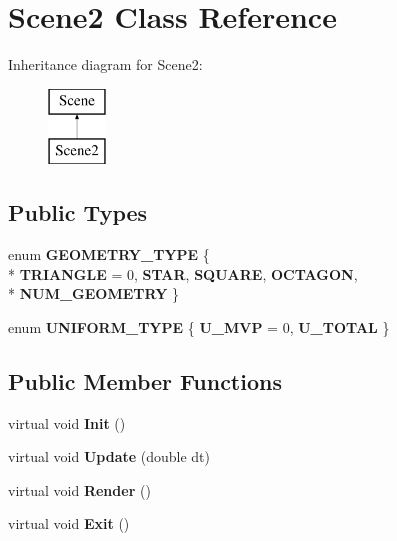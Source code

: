 \hypertarget{class_scene2}{\section{Scene2 Class Reference}
\label{class_scene2}
}
Inheritance diagram for Scene2\+:\begin{figure}[H]
\begin{center}
\leavevmode
\includegraphics[height=2.000000cm]{class_scene2}
\end{center}
\end{figure}
\subsection*{Public Types}
\begin{DoxyCompactItemize}
\item 
\hypertarget{class_scene2_a028873b2024a640768bebc50fb1b0b0e}{enum {\bfseries G\+E\+O\+M\+E\+T\+R\+Y\+\_\+\+T\+Y\+P\+E} \{ \\*
{\bfseries T\+R\+I\+A\+N\+G\+L\+E} = 0, 
{\bfseries S\+T\+A\+R}, 
{\bfseries S\+Q\+U\+A\+R\+E}, 
{\bfseries O\+C\+T\+A\+G\+O\+N}, 
\\*
{\bfseries N\+U\+M\+\_\+\+G\+E\+O\+M\+E\+T\+R\+Y}
 \}}\label{class_scene2_a028873b2024a640768bebc50fb1b0b0e}

\item 
\hypertarget{class_scene2_a49448a0d6704fdddc6be96a09c943d99}{enum {\bfseries U\+N\+I\+F\+O\+R\+M\+\_\+\+T\+Y\+P\+E} \{ {\bfseries U\+\_\+\+M\+V\+P} = 0, 
{\bfseries U\+\_\+\+T\+O\+T\+A\+L}
 \}}\label{class_scene2_a49448a0d6704fdddc6be96a09c943d99}

\end{DoxyCompactItemize}
\subsection*{Public Member Functions}
\begin{DoxyCompactItemize}
\item 
\hypertarget{class_scene2_ad452e11ff007a8a1a410284630eb6f12}{virtual void {\bfseries Init} ()}\label{class_scene2_ad452e11ff007a8a1a410284630eb6f12}

\item 
\hypertarget{class_scene2_a26d9fb1c36b04d8b3dac98740f7f77e6}{virtual void {\bfseries Update} (double dt)}\label{class_scene2_a26d9fb1c36b04d8b3dac98740f7f77e6}

\item 
\hypertarget{class_scene2_ac035da5e87c59e6b1828ceec8193cea4}{virtual void {\bfseries Render} ()}\label{class_scene2_ac035da5e87c59e6b1828ceec8193cea4}

\item 
\hypertarget{class_scene2_ae4c94dab85cfe1e734af4e288060dec4}{virtual void {\bfseries Exit} ()}\label{class_scene2_ae4c94dab85cfe1e734af4e288060dec4}

\end{DoxyCompactItemize}
